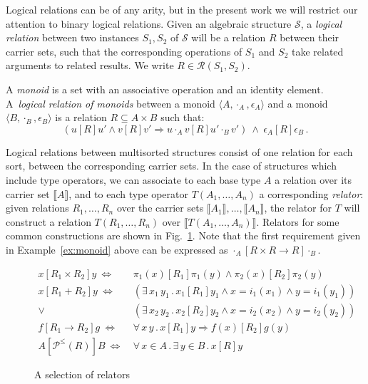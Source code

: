 \documentclass[sigplan,10pt,review,anonymous]{acmart}
\newcommand{\ifr}[1]{\mathrel{[{#1}]}}
\begin{document}
Logical relations can be of any arity,
but in the present work
we will restrict our attention to
binary logical relations.
Given an algebraic structure $\mathcal{S}$,
a \emph{logical relation}
between two instances $S_1, S_2$ of $\mathcal{S}$
will be a relation $R$
between their carrier sets,
such that the corresponding operations of $S_1$ and $S_2$
take related arguments to related results.
We write $R \in \mathcal{R}(S_1, S_2)$.

\begin{example}
\label{ex:monoid}
A \emph{monoid} is a set with
an associative operation and
an identity element.
A~\emph{logical relation of monoids} between
a monoid $\langle A, \cdot_A, \epsilon_A \rangle$ and
a monoid $\langle B, \cdot_B, \epsilon_B \rangle$
is a relation $R \subseteq A \times B$
such that:
\[
(u \ifr{R} u' \wedge v \ifr{R} v' \Rightarrow u \cdot_A v \ifr{R} u' \cdot_B v')
\: \wedge \:
\epsilon_A \ifr{R} \epsilon_B \,.
\]
\end{example}

Logical relations between multisorted structures
consist of one relation for each sort,
between the corresponding carrier sets.
In the case of structures which include type operators,
we can associate to each base type $A$
a relation over its carrier set $\llbracket A \rrbracket$,
and to each type operator $T(A_1, \ldots, A_n)$
a corresponding \emph{relator}:
given relations $R_1, \ldots, R_n$ over
the carrier sets $\llbracket A_1 \rrbracket, \ldots, \llbracket A_n \rrbracket$,
the relator for $T$
will construct a relation $T(R_1, \ldots, R_n)$
over $\llbracket T(A_1, \ldots, A_n) \rrbracket$.
Relators for some common constructions are shown in Fig.~\ref{fig:relators}.
Note that the first requirement given in Example~\ref{ex:monoid} above
can be expressed as
$
  \cdot_A \ifr{R \times R \rightarrow R} \cdot_B
$.

\begin{figure} %
  {\small
  \begin{align*}
    x \ifr{R_1 \times R_2} y \ \Leftrightarrow\  &
      \pi_1(x) \ifr{R_1} \pi_1(y) \wedge
      \pi_2(x) \ifr{R_2} \pi_2(y) \\
    x \ifr{R_1 + R_2} y \ \Leftrightarrow\  &
      (\exists \, x_1 \, y_1 \,.\,
        x_1 \ifr{R_1} y_1 \wedge
        x = i_1(x_1) \wedge
        y = i_1(y_1)) \\ \vee\ &
      (\exists \, x_2 \, y_2 \,.\,
        x_2 \ifr{R_2} y_2 \wedge
        x = i_2(x_2) \wedge
        y = i_2(y_2)) \\
    f \ifr{R_1 \rightarrow R_2} g \ \Leftrightarrow\  &
      \forall \, x \, y \,.\,
        x \ifr{R_1} y \Rightarrow
        f(x) \ifr{R_2} g(y) \\
    A \ifr{\mathcal{P}^\le(R)} B \ \Leftrightarrow\  &
      \forall \, x \in A \,.\,
      \exists \, y \in B \,.\,
      x \ifr{R} y
  \end{align*}
  }%
  \caption{A selection of relators}
  \label{fig:relators}
\end{figure}
\end{document}
